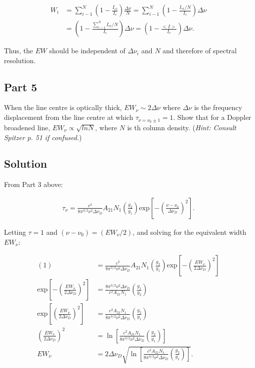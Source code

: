 \documentclass[12pt]{article}
\begin{document}
\begin{equation*}
\begin{split}
W_i &= \sum_{i-1}^N\left(1 - \frac{I_{vi}}{I_c}\right)\frac{\Delta\nu}{N} = \sum_{i-1}^N\left(1 - \frac{I_{vi}/N}{I_c}\right)\Delta\nu \\
&= \left(1 - \frac{\sum_{i-1}^NI_{vi}/N}{I_c}\right)\Delta\nu = \left(1 - \frac{<I>}{I_c}\right)\Delta\nu.
\end{split}
\end{equation*}

Thus, the $EW$ should be independent of $\Delta\nu_i$ and $N$ and therefore of spectral resolution.

\subsection*{Part 5}

When the line centre is optically thick, $EW_\nu \sim 2\Delta\nu$ where $\Delta\nu$ is the frequency displacement from the line centre at which $\tau_{\nu = \nu_0\pm 1} = 1$. Show that for a Doppler broadened line, $EW_\nu \propto \sqrt{lnN}$, where $N$ is th column density. (\textit{Hint: Consult Spitzer p. 51 if confused.})

\subsection*{Solution}

From Part 3 above:

\begin{align*}
\tau_\nu = \frac{c^2}{8\pi^{3/2}\nu^2\Delta\nu_D}A_{21}N_1\left(\frac{g_2}{g_1}\right)\mathrm{exp}\left[-\left(\frac{\nu-\nu_0}{\Delta\nu_D}\right)^2\right].
\end{align*}

Letting $\tau=1$ and $(\nu-\nu_0)=(EW_\nu/2)$, and solving for the equivalent width $EW_\nu$:

\begin{equation*}
\begin{split}
(1) &= \frac{c^2}{8\pi^{3/2}\nu^2\Delta\nu_D}A_{21}N_1\left(\frac{g_2}{g_1}\right)\mathrm{exp}\left[-\left(\frac{EW_\nu}{2\Delta\nu_D}\right)^2\right]\\
\mathrm{exp}\left[-\left(\frac{EW_\nu}{2\Delta\nu_D}\right)^2\right] &= \frac{8\pi^{3/2}\nu^2\Delta\nu_D}{c^2A_{21}N_1}\left(\frac{g_1}{g_2}\right)\\
\mathrm{exp}\left[\left(\frac{EW_\nu}{2\Delta\nu_D}\right)^2\right] &= \frac{c^2A_{21}N_1}{8\pi^{3/2}\nu^2\Delta\nu_D}\left(\frac{g_2}{g_1}\right)\\
\left(\frac{EW_\nu}{2\Delta\nu_D}\right)^2 &= \ln\left[\frac{c^2A_{21}N_1}{8\pi^{3/2}\nu^2\Delta\nu_D}\left(\frac{g_2}{g_1}\right)\right]\\
EW_\nu &= 2\Delta\nu_D\sqrt{\ln\left[\frac{c^2A_{21}N_1}{8\pi^{3/2}\nu^2\Delta\nu_D}\left(\frac{g_2}{g_1}\right)\right]}.
\end{split}
\end{equation*}
\end{document}
